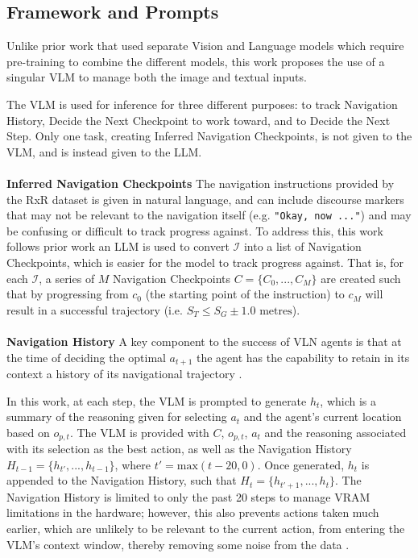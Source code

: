 \documentclass{svproc}
\begin{document}
\subsection{Framework and Prompts}
    Unlike prior work that used separate Vision and Language models \cite{zhou2023navgptexplicitreasoningvisionandlanguage, 51647} which require pre-training to combine the different models, this work proposes the use of a singular VLM to manage both the image and textual inputs.
    \par The VLM is used for inference for three different purposes: to track Navigation History, Decide the Next Checkpoint to work toward, and to Decide the Next Step. Only one task, creating Inferred Navigation Checkpoints, is not given to the VLM, and is instead given to the LLM. 
    \\ \\
    \textbf{Inferred Navigation Checkpoints}  The navigation instructions provided by the RxR dataset is given in natural language, and can include discourse markers that may not be relevant to the navigation itself (e.g. \texttt{"Okay, now ..."}) and may be confusing or difficult to track progress against. To address this, this work follows prior work \cite{open-nav,navgpt2} an LLM is used to convert $\mathcal{I}$ into a list of Navigation Checkpoints, which is easier for the model to track progress against. That is, for each $\mathcal{I}$, a series of $M$ Navigation Checkpoints $C = \{C_0, ..., C_M\}$ are created such that by progressing from $c_0$ (the starting point of the instruction) to $c_M$ will result in a successful trajectory (i.e. $S_T \leq S_G\pm  1.0 \text{ metres}$).
    \\ \\
    \textbf{Navigation History}  A key component to the success of VLN agents is that at the time of deciding the optimal $a_{t+1}$ the agent has the capability to retain in its context a history of its navigational trajectory \cite{chen2021_HAMT, HE2024110511_MemoryAdaptiveVLN}.
    \par In this work, at each step, the VLM is prompted to generate $h_t$, which is a summary of the reasoning given for selecting $a_t$ and the agent's current location based on $o_{p,t}$. The VLM is provided with $C$, $o_{p,t}$, ${a_t}$ and the reasoning associated with its selection as the best action, as well as the Navigation History $H_{t-1} = \{h_{t'}, ..., h_{t-1}\}$, where $t' = \text{max}(t-20, 0)$. Once generated, $h_t$ is appended to the Navigation History, such that $H_t = \{h_{t'+1}, ..., h_t\}$. The Navigation History is limited to only the past 20 steps to manage VRAM limitations in the hardware; however, this also prevents actions taken much earlier, which are unlikely to be relevant to the current action, from entering the VLM's context window, thereby removing some noise from the data \cite{HE2024110511_MemoryAdaptiveVLN}.
\end{document}

